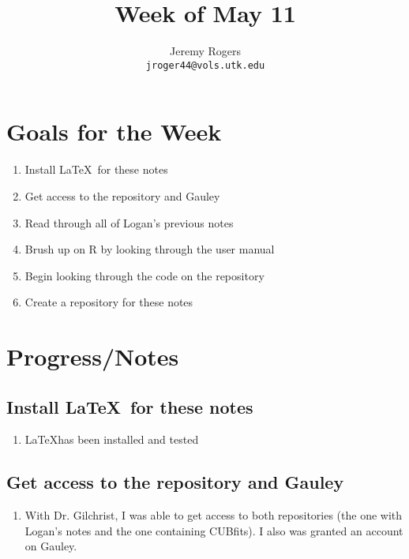 \documentclass[12 pt]{article}
\title{Week of May 11}
\author{Jeremy Rogers \\
	\texttt{jroger44@vols.utk.edu}}
\begin{document}
	\maketitle
	
	\tableofcontents
	
	\section{Goals for the Week}
	\begin{enumerate}
		\item Install \LaTeX\ for these notes
		\item Get access to the repository and Gauley
		\item Read through all of Logan's previous notes
		\item Brush up on R by looking through the user manual
		\item Begin looking through the code on the repository
		\item Create a repository for these notes
	\end{enumerate}
	
	\section{Progress/Notes}
	
	\subsection{Install \LaTeX\ for these notes}
		\begin{enumerate}
			\item \LaTeX has been installed and tested
		\end{enumerate}
	
	\subsection{Get access to the repository and Gauley}
		 \begin{enumerate}
		 	\item With Dr. Gilchrist, I was able to get access to both repositories (the one with Logan's notes and the one containing CUBfits). I also was granted an account on Gauley.
		 \end{enumerate}
\end{document}
